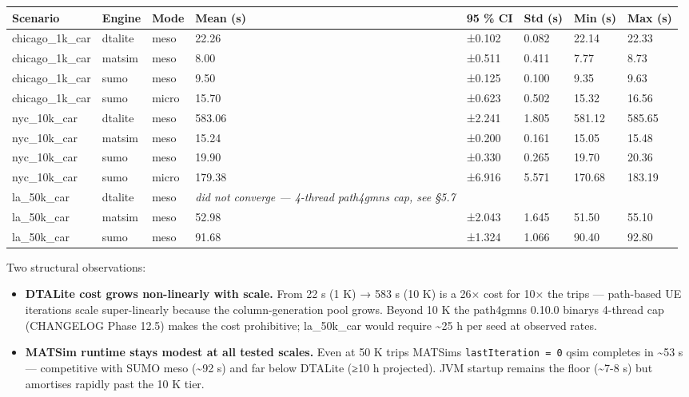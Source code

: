 \begin{longtable}[]{@{}llllllll@{}}
\toprule\noalign{}
Scenario & Engine & Mode & Mean (s) & 95 \% CI & Std (s) & Min (s) & Max
(s) \\
\midrule\noalign{}
\endhead
\bottomrule\noalign{}
\endlastfoot
chicago\_1k\_car & dtalite & meso & 22.26 & ±0.102 & 0.082 & 22.14 &
22.33 \\
chicago\_1k\_car & matsim & meso & 8.00 & ±0.511 & 0.411 & 7.77 &
8.73 \\
chicago\_1k\_car & sumo & meso & 9.50 & ±0.125 & 0.100 & 9.35 & 9.63 \\
chicago\_1k\_car & sumo & micro & 15.70 & ±0.623 & 0.502 & 15.32 &
16.56 \\
nyc\_10k\_car & dtalite & meso & 583.06 & ±2.241 & 1.805 & 581.12 &
585.65 \\
nyc\_10k\_car & matsim & meso & 15.24 & ±0.200 & 0.161 & 15.05 &
15.48 \\
nyc\_10k\_car & sumo & meso & 19.90 & ±0.330 & 0.265 & 19.70 & 20.36 \\
nyc\_10k\_car & sumo & micro & 179.38 & ±6.916 & 5.571 & 170.68 &
183.19 \\
la\_50k\_car & dtalite & meso & \emph{did not converge --- 4-thread
path4gmns cap, see §5.7} & & & & \\
la\_50k\_car & matsim & meso & 52.98 & ±2.043 & 1.645 & 51.50 & 55.10 \\
la\_50k\_car & sumo & meso & 91.68 & ±1.324 & 1.066 & 90.40 & 92.80 \\
\end{longtable}

Two structural observations:

\begin{itemize}
\tightlist
\item
  \textbf{DTALite cost grows non-linearly with scale.} From 22 s (1 K) →
  583 s (10 K) is a 26× cost for 10× the trips --- path-based UE
  iterations scale super-linearly because the column-generation pool
  grows. Beyond 10 K the path4gmns 0.10.0 binary\textquotesingle s
  4-thread cap (CHANGELOG Phase 12.5) makes the cost prohibitive;
  la\_50k\_car would require \textasciitilde25 h per seed at observed
  rates.
\item
  \textbf{MATSim runtime stays modest at all tested scales.} Even at 50
  K trips MATSim\textquotesingle s \texttt{lastIteration\ =\ 0} qsim
  completes in \textasciitilde53 s --- competitive with SUMO meso
  (\textasciitilde92 s) and far below DTALite (≥10 h projected). JVM
  startup remains the floor (\textasciitilde7-8 s) but amortises rapidly
  past the 10 K tier.
\end{itemize}

